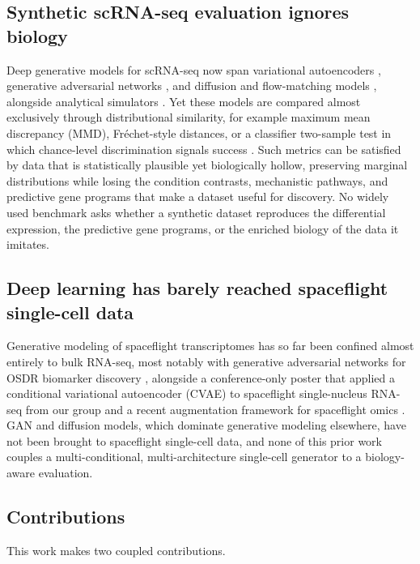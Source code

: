 \documentclass[11pt]{article}
\begin{document}
\subsection{Synthetic scRNA-seq evaluation ignores biology}
Deep generative models for scRNA-seq now span variational autoencoders \cite{scvi,activa}, generative adversarial networks \cite{scgan}, and diffusion and flow-matching models \cite{scdiffusion,cfdiffusion,cfgen}, alongside analytical simulators \cite{scgft,scdesign3,simbench}. Yet these models are compared almost exclusively through distributional similarity, for example maximum mean discrepancy (MMD), Fr\'echet-style distances, or a classifier two-sample test in which chance-level discrimination signals success \cite{scgan,scdiffusion}. Such metrics can be satisfied by data that is statistically plausible yet biologically hollow, preserving marginal distributions while losing the condition contrasts, mechanistic pathways, and predictive gene programs that make a dataset useful for discovery. No widely used benchmark asks whether a synthetic dataset reproduces the differential expression, the predictive gene programs, or the enriched biology of the data it imitates.

\subsection{Deep learning has barely reached spaceflight single-cell data}
Generative modeling of spaceflight transcriptomes has so far been confined almost entirely to bulk RNA-seq, most notably with generative adversarial networks for OSDR biomarker discovery \cite{ganbio}, alongside a conference-only poster that applied a conditional variational autoencoder (CVAE) to spaceflight single-nucleus RNA-seq from our group \cite{ntrs} and a recent augmentation framework for spaceflight omics \cite{glare}. GAN and diffusion models, which dominate generative modeling elsewhere, have not been brought to spaceflight single-cell data, and none of this prior work couples a multi-conditional, multi-architecture single-cell generator to a biology-aware evaluation.

\subsection{Contributions}
This work makes two coupled contributions.
\end{document}
